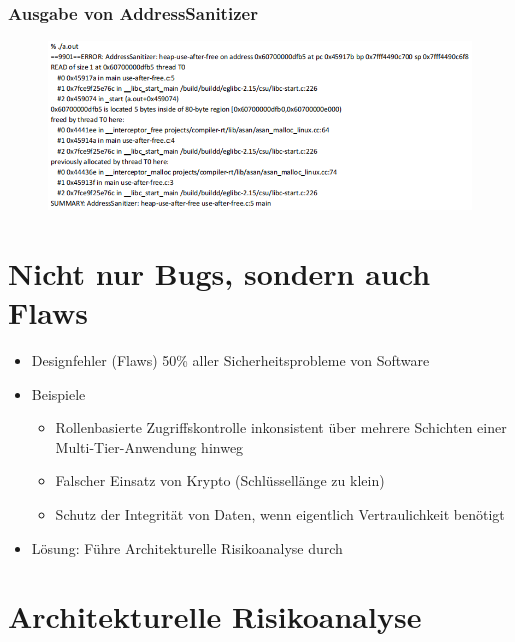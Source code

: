 \documentclass[openany]{book}
\begin{document}
\newpage

\subsubsection{Ausgabe von AddressSanitizer}

\begin{figure}[h!]
    \centering
    \includegraphics[width=\linewidth]{Pics/AddressSanitizer.PNG}
\end{figure}

\section{Nicht nur Bugs, sondern auch Flaws}

\begin{itemize}
    \item Designfehler (Flaws) 50\% aller Sicherheitsprobleme von Software
    \item Beispiele
    \begin{itemize}
        \item Rollenbasierte Zugriffskontrolle inkonsistent über mehrere Schichten einer Multi-Tier-Anwendung hinweg
        \item Falscher Einsatz von Krypto (Schlüssellänge zu klein)
        \item Schutz der Integrität von Daten, wenn eigentlich Vertraulichkeit benötigt
    \end{itemize}
    \item Lösung: Führe Architekturelle Risikoanalyse durch
\end{itemize}

\section{Architekturelle Risikoanalyse}
\end{document}
